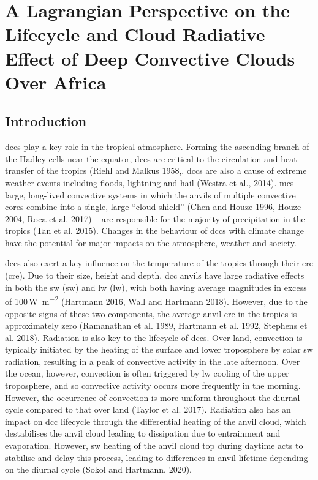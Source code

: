 \chapter{A Lagrangian Perspective on the Lifecycle and Cloud Radiative Effect of Deep Convective Clouds Over Africa} \label{chp:radiative_effect}


\section{Introduction}

\acrshort{dcc}s play a key role in the tropical atmosphere. 
Forming the ascending branch of the Hadley cells near the equator, \acrshort{dcc}s are critical to the circulation and heat transfer of the tropics (Riehl and Malkus 1958,\citep{weisman_mesoscale_2015}. 
\acrshort{dcc}s are also a cause of extreme weather events including floods, lightning and hail (Westra et al., 2014). 
\acrshort{mcs} -- large, long-lived convective systems in which the anvils of multiple convective cores combine into a single, large ``cloud shield'' (Chen and Houze 1996, Houze 2004, Roca et al. 2017) -- are responsible for the majority of precipitation in the tropics (Tan et al. 2015). 
Changes in the behaviour of \acrshort{dcc}s with climate change have the potential for major impacts on the atmosphere, weather and society.

\acrshort{dcc}s also exert a key influence on the temperature of the tropics through their \acrshort{cre} (\acrshort{cre}). 
Due to their size, height and depth, \acrshort{dcc} anvils have large radiative effects in both the \acrshort{sw} (\acrshort{sw}) and \acrshort{lw} (\acrshort{lw}), with both having average magnitudes in excess of 100\,\unit{W m^{-2}} (Hartmann 2016, Wall and Hartmann 2018). 
However, due to the opposite signs of these two components, the average anvil \acrshort{cre} in the tropics is approximately zero (Ramanathan et al. 1989, Hartmann et al. 1992, Stephens et al. 2018). 
Radiation is also key to the lifecycle of \acrshort{dcc}s. 
Over land, convection is typically initiated by the heating of the surface and lower troposphere by solar \acrshort{sw} radiation, resulting in a peak of convective activity in the late afternoon. 
Over the ocean, however, convection is often triggered by \acrshort{lw} cooling of the upper troposphere, and so convective activity occurs more frequently in the morning. 
However, the occurrence of convection is more uniform throughout the diurnal cycle compared to that over land (Taylor et al. 2017). 
Radiation also has an impact on \acrshort{dcc} lifecycle through the differential heating of the anvil cloud, which destabilises the anvil cloud leading to dissipation due to entrainment and evaporation. 
However, \acrshort{sw} heating of the anvil cloud top during daytime acts to stabilise and delay this process, leading to differences in anvil lifetime depending on the diurnal cycle (Sokol and Hartmann, 2020).

